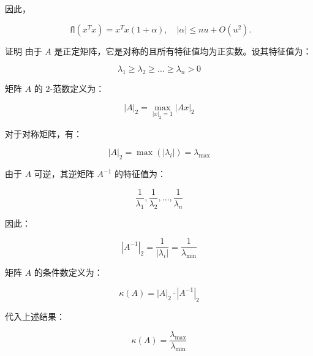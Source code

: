因此，

\[\text{ fl}\left( x^{T}x \right) = x^{T}x(1 + \alpha),\quad|\alpha| \leq nu + O\left( u^{2} \right).\]

证明 由于 \(A\)
是正定矩阵，它是对称的且所有特征值均为正实数。设其特征值为：

\[\lambda_{1} \geq \lambda_{2} \geq \ldots \geq \lambda_{n} > 0\]

矩阵 \(A\) 的 2-范数定义为：

\[|A|_{2} = \max\limits_{|x|_{2} = 1}\left| {Ax} \right|_{2}\]

对于对称矩阵，有：

\[|A|_{2} = \max(|\lambda_{i}|) = \lambda_{\max}\]

由于 \(A\) 可逆，其逆矩阵 \(A^{- 1}\) 的特征值为：

\[\frac{1}{\lambda_{1}},\frac{1}{\lambda_{2}},\ldots,\frac{1}{\lambda_{n}}\]

因此：

\[\left| A^{- 1} \right|_{2} = \frac{1}{\left| \lambda_{i} \right|} = \frac{1}{\lambda_{\min}}\]

矩阵 \(A\) 的条件数定义为：

\[\kappa(A) = |A|_{2} \cdot \left| A^{- 1} \right|_{2}\]

代入上述结果：

\[\kappa(A) = \frac{\lambda_{\max}}{\lambda_{\min}}\]
